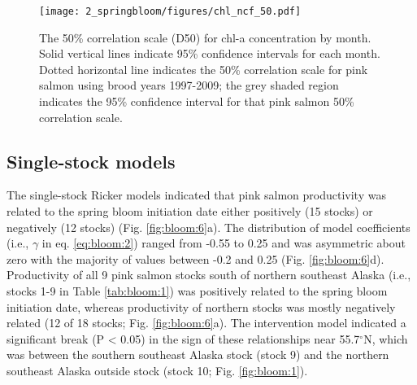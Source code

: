 \begin{figure}[htbp]
  \centering \texttt{[image: 2\_springbloom/figures/chl\_ncf\_50.pdf]}
  \caption[The 50\% correlation scale for chl-a concentration by month.]{The
           50\% correlation scale (D50) for chl-a concentration by month.  Solid
           vertical lines indicate 95\% confidence intervals for each month.
           Dotted horizontal line indicates the 50\% correlation scale for pink
           salmon using brood years 1997-2009; the grey shaded region indicates
           the 95\% confidence interval for that pink salmon 50\% correlation
           scale.}
  \label{fig:bloom:5}
\end{figure}


\subsection{Single-stock models}

The single-stock Ricker models indicated that pink salmon productivity was
related to the spring bloom initiation date either positively (15 stocks) or
negatively (12 stocks) (Fig. \ref{fig:bloom:6}a). The distribution of model
coefficients (i.e., \(\gamma\) in eq. \ref{eq:bloom:2}) ranged from -0.55 to
0.25 and was asymmetric about zero with the majority of values between -0.2 and
0.25 (Fig.  \ref{fig:bloom:6}d).  Productivity of all 9 pink salmon stocks south
of northern southeast Alaska (i.e., stocks 1-9 in Table \ref{tab:bloom:1}) was
positively related to the spring bloom initiation date, whereas productivity of
northern stocks was mostly negatively related (12 of 18 stocks; Fig.
\ref{fig:bloom:6}a). The intervention model indicated a significant break (P
\textless{} 0.05) in the sign of these relationships near 55.7$^{\circ}$N, which
was between the southern southeast Alaska stock (stock 9) and the northern
southeast Alaska outside stock (stock 10; Fig.  \ref{fig:bloom:1}).


